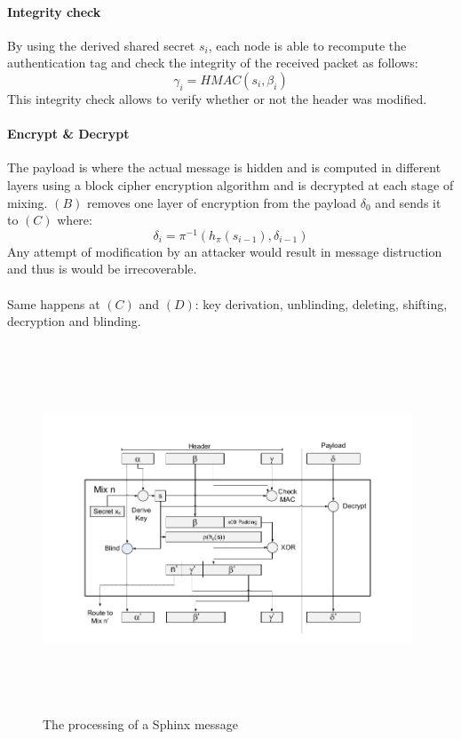\paragraph{Integrity check}
By using the derived shared secret $s_i$, each node is able to recompute the authentication tag and check the integrity of the received packet as follows: $$\gamma_i=HMAC(s_i,\beta_i)$$
This integrity check allows to verify whether or not the header was modified.
\paragraph{Encrypt \& Decrypt}
The payload is where the actual message is hidden and is computed in different layers using a block cipher encryption algorithm and is decrypted at each stage of mixing. $(B)$ removes one layer of encryption from the payload $\delta_0$ and sends it to $(C)$ where:
$$\delta_i=\pi^{-1}(h_{\pi}(s_{i-1}), \delta_{i-1})$$
Any attempt of modification by an attacker would result in message distruction and thus is would be irrecoverable. 
\\~\\Same happens at $(C)$ and $(D)$: key derivation, unblinding, deleting, shifting, decryption and blinding. 
\begin{figure}[H]
    \centering
    \includegraphics[width=11cm,height=11cm,keepaspectratio]{../yellowpaper/images/sphinx1.png}
    \caption{The processing of a Sphinx message}
    \label{fig:The processing of a Sphinx message }
\end{figure}
